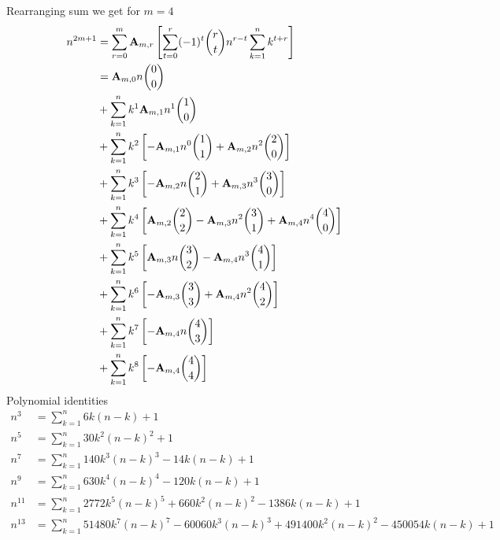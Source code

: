Rearranging sum we get for $m=4$
\begin{equation}
    \begin{split}
        n^{2m+1}
        &= \sum_{r=0}^{m} {\mathbf{A}} \sb{m,r} \left[ \sum_{t=0}^{r} (-1)^t \binom{r}{t} n^{r-t} \sum_{k=1}^{n} k^{t+r} \right] \\
        &= {\mathbf{A}} \sb{m,0} n \binom{0}{0}\\
        &+ \sum_{k=1}^{n} k^{1} {\mathbf{A}} \sb{m,1} n^{1} \binom{1}{0} \\
        &+ \sum_{k=1}^{n} k^{2} \left[ - {\mathbf{A}} \sb{m,1} n^{0} \binom{1}{1} + {\mathbf{A}} \sb{m,2} n^{2} \binom{2}{0} \right] \\
        &+ \sum_{k=1}^{n} k^{3} \left[ - {\mathbf{A}} \sb{m,2} n \binom{2}{1} + {\mathbf{A}} \sb{m,3} n^3 \binom{3}{0} \right] \\
        &+ \sum_{k=1}^{n} k^{4} \left[ {\mathbf{A}} \sb{m,2} \binom{2}{2} - {\mathbf{A}} \sb{m,3} n^2 \binom{3}{1} + {\mathbf{A}} \sb{m,4} n^4 \binom{4}{0} \right] \\
        &+ \sum_{k=1}^{n} k^{5} \left[ {\mathbf{A}} \sb{m,3} n \binom{3}{2} - {\mathbf{A}} \sb{m,4} n^3 \binom{4}{1} \right] \\
        &+ \sum_{k=1}^{n} k^{6} \left[ - {\mathbf{A}} \sb{m,3} \binom{3}{3} + {\mathbf{A}} \sb{m,4} n^2 \binom{4}{2} \right] \\
        &+ \sum_{k=1}^{n} k^{7} \left[ - {\mathbf{A}} \sb{m,4} n \binom{4}{3} \right] \\
        &+ \sum_{k=1}^{n} k^{8} \left[ - {\mathbf{A}} \sb{m,4} \binom{4}{4} \right]
    \end{split}\label{eq:equation18}
\end{equation}
Polynomial identities
\begin{align*}
    n^3 &= \sum_{k=1}^{n} 6k(n-k) + 1 \\
    n^5 &= \sum_{k=1}^{n} 30k^2(n-k)^2 + 1 \\
    n^7 &= \sum_{k=1}^{n} 140 k^3 (n-k)^3 - 14k(n-k) + 1 \\
    n^9 &= \sum_{k=1}^{n} 630 k^4(n-k)^4 - 120k(n-k) + 1 \\
    n^{11} &= \sum_{k=1}^{n} 2772 k^5(n-k)^5 + 660 k^2(n-k)^2 - 1386k(n-k) + 1 \\
    n^{13} &= \sum_{k=1}^{n} 51480 k^7(n-k)^7 - 60060 k^3(n-k)^3 + 491400k^2(n-k)^{2} - 450054k(n-k) + 1 \\
\end{align*}